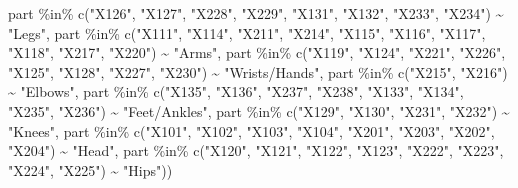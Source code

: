 \documentclass[
  letterpaper,
]{latex/krantz}
\makeatletter
\newenvironment{Shaded}{\begin{snugshade}}{\end{snugshade}}
\newcommand{\FunctionTok}[1]{\textcolor[rgb]{0.28,0.35,0.67}{#1}}
\newcommand{\NormalTok}[1]{\textcolor[rgb]{0.00,0.23,0.31}{#1}}
\newcommand{\SpecialCharTok}[1]{\textcolor[rgb]{0.37,0.37,0.37}{#1}}
\newcommand{\StringTok}[1]{\textcolor[rgb]{0.13,0.47,0.30}{#1}}
\newenvironment{kframe}{%
\medskip{}
\setlength{\fboxsep}{.8em}
 \def\at@end@of@kframe{}%
 \ifinner\ifhmode%
  \def\at@end@of@kframe{\end{minipage}}%
  \begin{minipage}{\columnwidth}%
 \fi\fi%
 \def\FrameCommand##1{\hskip\@totalleftmargin \hskip-\fboxsep
 \colorbox{shadecolor}{##1}\hskip-\fboxsep
     \hskip-\linewidth \hskip-\@totalleftmargin \hskip\columnwidth}%
 \MakeFramed {\advance\hsize-\width
   \@totalleftmargin\z@ \linewidth\hsize
   \@setminipage}}%
 {\par\unskip\endMakeFramed%
 \at@end@of@kframe}
\renewenvironment{Shaded}{\begin{kframe}}{\end{kframe}}
\makeatother
\begin{document}
\begin{Shaded}
\begin{Highlighting}[]
\NormalTok{    part }\SpecialCharTok{\%in\%} \FunctionTok{c}\NormalTok{(}\StringTok{"X126"}\NormalTok{, }\StringTok{"X127"}\NormalTok{, }\StringTok{"X228"}\NormalTok{, }\StringTok{"X229"}\NormalTok{,}
                \StringTok{"X131"}\NormalTok{, }\StringTok{"X132"}\NormalTok{, }\StringTok{"X233"}\NormalTok{, }\StringTok{"X234"}\NormalTok{) }\SpecialCharTok{\textasciitilde{}} \StringTok{"Legs"}\NormalTok{,}
\NormalTok{    part }\SpecialCharTok{\%in\%} \FunctionTok{c}\NormalTok{(}\StringTok{"X111"}\NormalTok{, }\StringTok{"X114"}\NormalTok{, }\StringTok{"X211"}\NormalTok{, }\StringTok{"X214"}\NormalTok{, }\StringTok{"X115"}\NormalTok{, }\StringTok{"X116"}\NormalTok{,}
                \StringTok{"X117"}\NormalTok{, }\StringTok{"X118"}\NormalTok{, }\StringTok{"X217"}\NormalTok{, }\StringTok{"X220"}\NormalTok{) }\SpecialCharTok{\textasciitilde{}} \StringTok{"Arms"}\NormalTok{,}
\NormalTok{    part }\SpecialCharTok{\%in\%} \FunctionTok{c}\NormalTok{(}\StringTok{"X119"}\NormalTok{, }\StringTok{"X124"}\NormalTok{, }\StringTok{"X221"}\NormalTok{, }\StringTok{"X226"}\NormalTok{, }\StringTok{"X125"}\NormalTok{, }\StringTok{"X128"}\NormalTok{,}
                \StringTok{"X227"}\NormalTok{, }\StringTok{"X230"}\NormalTok{) }\SpecialCharTok{\textasciitilde{}} \StringTok{"Wrists/Hands"}\NormalTok{,}
\NormalTok{    part }\SpecialCharTok{\%in\%} \FunctionTok{c}\NormalTok{(}\StringTok{"X215"}\NormalTok{, }\StringTok{"X216"}\NormalTok{) }\SpecialCharTok{\textasciitilde{}} \StringTok{"Elbows"}\NormalTok{,}
\NormalTok{    part }\SpecialCharTok{\%in\%} \FunctionTok{c}\NormalTok{(}\StringTok{"X135"}\NormalTok{, }\StringTok{"X136"}\NormalTok{, }\StringTok{"X237"}\NormalTok{, }\StringTok{"X238"}\NormalTok{, }\StringTok{"X133"}\NormalTok{, }\StringTok{"X134"}\NormalTok{,}
                \StringTok{"X235"}\NormalTok{, }\StringTok{"X236"}\NormalTok{) }\SpecialCharTok{\textasciitilde{}} \StringTok{"Feet/Ankles"}\NormalTok{,}
\NormalTok{    part }\SpecialCharTok{\%in\%} \FunctionTok{c}\NormalTok{(}\StringTok{"X129"}\NormalTok{, }\StringTok{"X130"}\NormalTok{, }\StringTok{"X231"}\NormalTok{, }\StringTok{"X232"}\NormalTok{) }\SpecialCharTok{\textasciitilde{}} \StringTok{"Knees"}\NormalTok{,}
\NormalTok{    part }\SpecialCharTok{\%in\%} \FunctionTok{c}\NormalTok{(}\StringTok{"X101"}\NormalTok{, }\StringTok{"X102"}\NormalTok{, }\StringTok{"X103"}\NormalTok{, }\StringTok{"X104"}\NormalTok{, }\StringTok{"X201"}\NormalTok{, }\StringTok{"X203"}\NormalTok{,}
                \StringTok{"X202"}\NormalTok{, }\StringTok{"X204"}\NormalTok{) }\SpecialCharTok{\textasciitilde{}} \StringTok{"Head"}\NormalTok{,}
\NormalTok{    part }\SpecialCharTok{\%in\%} \FunctionTok{c}\NormalTok{(}\StringTok{"X120"}\NormalTok{, }\StringTok{"X121"}\NormalTok{, }\StringTok{"X122"}\NormalTok{, }\StringTok{"X123"}\NormalTok{, }\StringTok{"X222"}\NormalTok{, }\StringTok{"X223"}\NormalTok{,}
                \StringTok{"X224"}\NormalTok{, }\StringTok{"X225"}\NormalTok{) }\SpecialCharTok{\textasciitilde{}} \StringTok{"Hips"}\NormalTok{))}
    

\end{Highlighting}
\end{Shaded}
\end{document}
